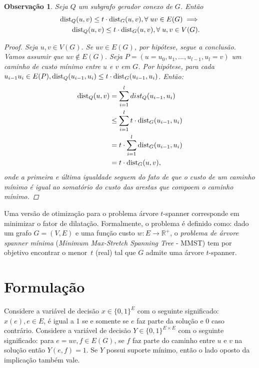 \documentclass[11pt,reqno]{amsart}
\newcommand{\dist}{{\rm dist}}
\newtheorem{observacao}{Observação}
\begin{document}
\begin{observacao}
\label{obs:relate_spanner_definitions}
Seja $Q$ um subgrafo gerador conexo de $G$. Então
\begin{equation*}
\begin{split}
\dist_{Q}(u,v) \le t \cdot \dist_{G}(u,v), \forall\;uv \in E(G) \implies \\
\dist_{Q}(u,v) \le t \cdot \dist_{G}(u,v), \forall\;u,v \in V(G).
\end{split}
\end{equation*}
\begin{proof}
Seja $u,v \in V(G)$. Se $uv \in E(G)$, por hipótese, segue a conclusão. 
Vamos assumir que $uv \notin E(G)$. Seja 
$P = (u = u_0, u_1, ..., u_{l-1}, u_l = v)$ um caminho de custo mínimo entre 
$u$ e $v$ em $G$. Por hipótese, para cada \\
\mbox{$u_{i-1}u_i \in E(P), \dist_{Q}(u_{i-1},u_i) \le t \cdot \dist_{G}(u_{i-1},u_i)$}.
 Então: 
\begin{align*}
\dist_{Q}(u,v) &= \sum_{i = 1}^{l} dist_{Q}(u_{i-1},u_i)\\ 
&\le \sum_{i = 1}^{l}t \cdot \dist_{G}(u_{i-1},u_i)\\
&= t \cdot \sum_{i = 1}^{l} \dist_{G}(u_{i-1},u_i)\\
&= t \cdot \dist_{G}(u,v),
\end{align*}
onde a primeira e última igualdade seguem do fato de que o custo de um 
caminho mínimo é igual ao somatório do custo das arestas que compoem o 
caminho mínimo.
\end{proof}
\end{observacao}

Uma versão de otimização para o problema árvore \hbox{$t$-spanner}
corresponde em minimizar o fator de dilatação. Formalmente, o problema
é definido como: dado um grafo $G=(V,E)$ e uma 
função custo $w: E \to \mathbb{R}^+$, o \emph{problema de árvore spanner mínima}
(\emph{Minimum Max-Stretch Spanning Tree} - MMST) tem por objetivo
encontrar o menor~$t$ (real) tal que $G$ admite uma árvore
$t$-spanner. 

\section{Formulação}
Considere a variável de decisão $x \in \{0,1\}^{E}$ com o seguinte 
significado: $x(e), e \in E$, é igual a 1 se e somente se $e$ faz parte da 
solução e 0 caso contrário. Considere a variável de decisão 
$Y \in \{0,1\}^{E \times E}$ com o seguinte significado: 
para $e = uv,f \in E(G)$, se $f$ faz parte do caminho entre $u$ e $v$ na 
solução então $Y(e,f) = 1$. Se $Y$ possui suporte mínimo, então o lado oposto 
da implicação também vale. 
\end{document}
